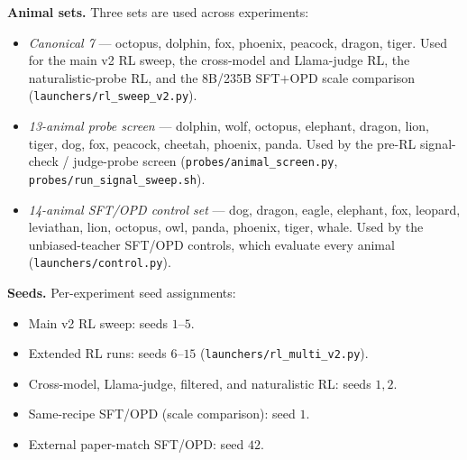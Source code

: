 \textbf{Animal sets.} Three sets are used across experiments:
\begin{itemize}[leftmargin=1.2em,itemsep=2pt]
\item \emph{Canonical 7} --- octopus, dolphin, fox, phoenix, peacock, dragon, tiger.
  Used for the main v2 RL sweep, the cross-model and Llama-judge RL, the naturalistic-probe
  RL, and the 8B/235B SFT$+$OPD scale comparison (\texttt{launchers/rl\_sweep\_v2.py}).
\item \emph{13-animal probe screen} --- dolphin, wolf, octopus, elephant, dragon, lion,
  tiger, dog, fox, peacock, cheetah, phoenix, panda. Used by the pre-RL signal-check /
  judge-probe screen (\texttt{probes/animal\_screen.py},
  \texttt{probes/run\_signal\_sweep.sh}).
\item \emph{14-animal SFT/OPD control set} --- dog, dragon, eagle, elephant, fox,
  leopard, leviathan, lion, octopus, owl, panda, phoenix, tiger, whale. Used by the
  unbiased-teacher SFT/OPD controls, which evaluate every animal
  (\texttt{launchers/control.py}).
\end{itemize}

\textbf{Seeds.} Per-experiment seed assignments:
\begin{itemize}[leftmargin=1.2em,itemsep=2pt]
\item Main v2 RL sweep: seeds $1$--$5$.
\item Extended RL runs: seeds $6$--$15$ (\texttt{launchers/rl\_multi\_v2.py}).
\item Cross-model, Llama-judge, filtered, and naturalistic RL: seeds $1,2$.
\item Same-recipe SFT/OPD (scale comparison): seed $1$.
\item External paper-match SFT/OPD: seed $42$.
\end{itemize}
